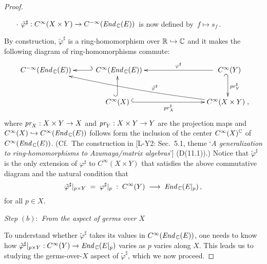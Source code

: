 \documentclass[11pt]{article}
\numberwithin{equation}{subsection}
\newcommand{\End}{\mbox{\it End}\,}
\newcommand{\pr}{\mbox{\it pr}}
\begin{document}
\begin{proof}
\begin{itemize}
  \item[{\Large $\cdot$}]
   $\tilde{\varphi}^{\sharp}:
      C^{\infty}(X\times Y)\rightarrow C^{-\infty}(\End_{\Bbb C}(E))\,$
     is now defined by $\,f\mapsto s_f\,$.
 \end{itemize}
By construction,
 $\tilde{\varphi}^{\sharp}$  is a ring-homomorphism
   over ${\Bbb R}\hookrightarrow{\Bbb C}$   and
 it makes the following diagram of ring-homomorphisms commute:
 $$
   \xymatrix{
    \hspace{1ex}
     C^{-\infty}(\End_{\Bbb C}(E))
	     &  \hspace{1ex}C^{\infty}(\End_{\Bbb C}(E))\ar @{_{(}->}[l]
	   &&& \rule{0ex}{3ex}\hspace{1ex}
	            C^{\infty}(Y)\ar[lll]_-{\varphi^{\sharp}}
	                            \ar @{_{(}->}[d]^{pr_Y^{\sharp}}        \\	
    & \rule{0ex}{2.4ex}
	     \;C^{\infty}(X)\; \ar @{^{(}->}[rrr]_-{pr_X^{\sharp}} \ar@{^{(}->}[u]
	    &&& C^{\infty}(X\times Y) 	  \ar @/^1ex /  [ullll]_(.4){\tilde{\varphi}^{\sharp}}\;,
	}
  $$
  where $\pr_X: X\times Y\rightarrow X$ and $\pr_Y: X\times Y\rightarrow Y$
    are the projection maps and
  $C^{\infty}(X)\hookrightarrow C^{\infty}(\End_{\Bbb C}(E))$
    follows form the inclusion of the center $C^{\infty}(X)^{\Bbb C}$
	of $C^{\infty}(\End_{\Bbb C}(E))$.
 (Cf.\ The construction in
               [L-Y2: Sec.\ 5.1,
			    theme `{\sl A generalization to ring-homomorphisms to Azumaya/matrix algebras}'] (D(11.1)).)
 Notice that $\tilde{\varphi}^{\sharp}$ is the only extension of $\varphi^{\sharp}$
  to $C^{\infty}(X\times Y)$
  that satisfies the above commutative diagram and the natural condition that
  $$
    \tilde{\varphi}^{\sharp}|_{{p}\times Y}\;=\;
	\varphi^{\sharp}|_{p}\;:\; C^{\infty}(Y)\;\longrightarrow\; \End_{\Bbb C}(E|_p)\,,
  $$
  for all $p\in X$.

 \bigskip

 \noindent
 {\it Step $(b):$ From the aspect of germs over $X$}

 \medskip

 \noindent
 {To} understand whether $\tilde{\varphi}^{\sharp}$ takes its values in
   $C^{\infty}(\End_{\Bbb C}(E))$, one needs to know
   how $\tilde{\varphi}^{\sharp}|_{p\times Y}:
                      C^{\infty}(Y)\rightarrow \End_{\Bbb C}(E|_p)$
	varies as $p$ varies along $X$.
 This leads us to studying the germs-over-$X$ aspect of $\tilde{\varphi}^{\sharp}$,
  which we now proceed.

 \bigskip


\end{proof}
\end{document}
